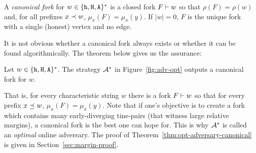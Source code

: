 \begin{definition}
  A \emph{canonical fork} for $w \in \{\mathtt{h}, \mathtt{H}, \mathtt{A}\}^*$ 
  is a closed fork $F \vdash w$ so that 
  $\rho(F) = \rho(w)$ 
  and, for all prefixes $x \prec w$, $\mu_x(F) = \mu_x(y)$. 
  If $|w| = 0$, $F$ is 
  the unique fork with a single (honest) vertex and no edge. 
\end{definition}

It is not obvious whether a canonical fork always exists 
or whether it can be found algorithmically. 
The theorem below gives us the assurance:


\begin{theorem}\label{thm:opt-adversary-canonical}
  Let $w \in \{\mathtt{h}, \mathtt{H}, \mathtt{A}\}^*$. 
  The strategy $\mathcal{A}^*$ in Figure~\ref{fig:adv-opt}
  outputs a canonical fork for $w$.  
\end{theorem}
That is, for every characteristic string $w$ 
there is a fork $F \vdash w$ so that 
for every prefix $x \preceq w$, $\mu_x(F) = \mu_x(y)$. 
Note that if one's objective is to create a fork 
which contains many early-diverging tine-pairs (that witness large relative margins), 
a canonical fork is the best one can hope for. 
This is why $\mathcal{A}^*$ is called an \emph{optimal} online adversary. 
The proof of Theorem~\ref{thm:opt-adversary-canonical} 
is given in Section~\ref{sec:margin-proof}.






